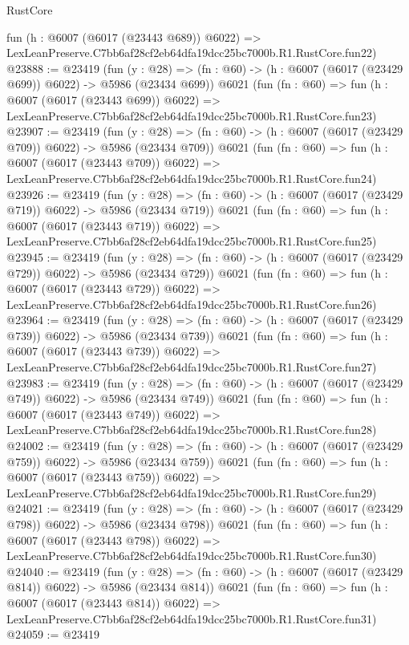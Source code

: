 \begin{lexlean}{RustCore}
\begin{coremodule}
    fun (h : @6007 (@6017 (@23443 @689)) @6022) =>
    LexLeanPreserve.C7bb6af28cf2eb64dfa19dcc25bc7000b.R1.RustCore.fun22)
@23888 := @23419
    (fun (y : @28) => (fn : @60) -> (h : @6007 (@6017 (@23429 @699)) @6022) -> @5986 (@23434 @699))
    @6021
    (fun (fn : @60) =>
    fun (h : @6007 (@6017 (@23443 @699)) @6022) =>
    LexLeanPreserve.C7bb6af28cf2eb64dfa19dcc25bc7000b.R1.RustCore.fun23)
@23907 := @23419
    (fun (y : @28) => (fn : @60) -> (h : @6007 (@6017 (@23429 @709)) @6022) -> @5986 (@23434 @709))
    @6021
    (fun (fn : @60) =>
    fun (h : @6007 (@6017 (@23443 @709)) @6022) =>
    LexLeanPreserve.C7bb6af28cf2eb64dfa19dcc25bc7000b.R1.RustCore.fun24)
@23926 := @23419
    (fun (y : @28) => (fn : @60) -> (h : @6007 (@6017 (@23429 @719)) @6022) -> @5986 (@23434 @719))
    @6021
    (fun (fn : @60) =>
    fun (h : @6007 (@6017 (@23443 @719)) @6022) =>
    LexLeanPreserve.C7bb6af28cf2eb64dfa19dcc25bc7000b.R1.RustCore.fun25)
@23945 := @23419
    (fun (y : @28) => (fn : @60) -> (h : @6007 (@6017 (@23429 @729)) @6022) -> @5986 (@23434 @729))
    @6021
    (fun (fn : @60) =>
    fun (h : @6007 (@6017 (@23443 @729)) @6022) =>
    LexLeanPreserve.C7bb6af28cf2eb64dfa19dcc25bc7000b.R1.RustCore.fun26)
@23964 := @23419
    (fun (y : @28) => (fn : @60) -> (h : @6007 (@6017 (@23429 @739)) @6022) -> @5986 (@23434 @739))
    @6021
    (fun (fn : @60) =>
    fun (h : @6007 (@6017 (@23443 @739)) @6022) =>
    LexLeanPreserve.C7bb6af28cf2eb64dfa19dcc25bc7000b.R1.RustCore.fun27)
@23983 := @23419
    (fun (y : @28) => (fn : @60) -> (h : @6007 (@6017 (@23429 @749)) @6022) -> @5986 (@23434 @749))
    @6021
    (fun (fn : @60) =>
    fun (h : @6007 (@6017 (@23443 @749)) @6022) =>
    LexLeanPreserve.C7bb6af28cf2eb64dfa19dcc25bc7000b.R1.RustCore.fun28)
@24002 := @23419
    (fun (y : @28) => (fn : @60) -> (h : @6007 (@6017 (@23429 @759)) @6022) -> @5986 (@23434 @759))
    @6021
    (fun (fn : @60) =>
    fun (h : @6007 (@6017 (@23443 @759)) @6022) =>
    LexLeanPreserve.C7bb6af28cf2eb64dfa19dcc25bc7000b.R1.RustCore.fun29)
@24021 := @23419
    (fun (y : @28) => (fn : @60) -> (h : @6007 (@6017 (@23429 @798)) @6022) -> @5986 (@23434 @798))
    @6021
    (fun (fn : @60) =>
    fun (h : @6007 (@6017 (@23443 @798)) @6022) =>
    LexLeanPreserve.C7bb6af28cf2eb64dfa19dcc25bc7000b.R1.RustCore.fun30)
@24040 := @23419
    (fun (y : @28) => (fn : @60) -> (h : @6007 (@6017 (@23429 @814)) @6022) -> @5986 (@23434 @814))
    @6021
    (fun (fn : @60) =>
    fun (h : @6007 (@6017 (@23443 @814)) @6022) =>
    LexLeanPreserve.C7bb6af28cf2eb64dfa19dcc25bc7000b.R1.RustCore.fun31)
@24059 := @23419

\end{coremodule}
\end{lexlean}
